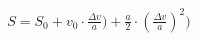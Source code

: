 \documentclass[preview]{standalone}
\begin{document}
\begin{align*}
S = S_{0} + v_{0} \cdot \frac{\Delta v}{a}) + \frac{a}{2} \cdot (\frac{\Delta v}{a})^2)
\end{align*}
\end{document}
